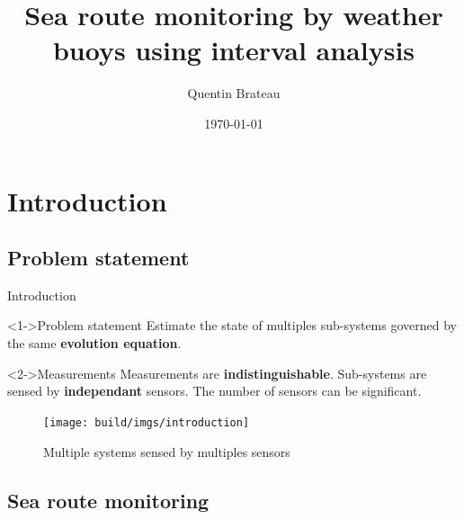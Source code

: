 \documentclass{beamer}
\title{Sea route monitoring by weather buoys using interval analysis}
\date{\today}
\author{Quentin Brateau}
\institute{ENSTA Bretagne}
\begin{document}
    \maketitle

    \section{Introduction}

        \subsection{Problem statement}

            \begin{frame}{Introduction}
                \begin{minipage}{0.55\textwidth}
                    \begin{block}<1->{Problem statement}
                        Estimate the state of multiples sub-systems governed by the same \textbf{evolution equation}.
                    \end{block}
                    \begin{block}<2->{Measurements}
                        Measurements are \textbf{indistinguishable}. Sub-systems are sensed by \textbf{independant} sensors. The number of sensors can be significant.
                    \end{block}
                \end{minipage}
                \hfill
                \begin{minipage}{0.4\textwidth}
                    \begin{figure}
                        \texttt{[image: build/imgs/introduction]}
                        \caption{Multiple systems sensed by multiples sensors}
                    \end{figure}
                \end{minipage}
            \end{frame}

        \subsection{Sea route monitoring}
\end{document}

